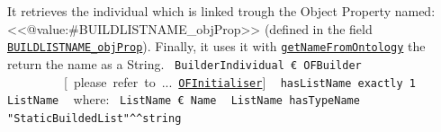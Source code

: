 \begin{description}
\begin{description}
  It retrieves the individual which is linked trough the Object Property named: <<@value:#BUILDLISTNAME_objProp>>
 (defined in the field \texttt{\hyperlink{ontologyFramework.OFRunning.OFInitialising.OFBuilderCommon.BUILDLISTNAME_objProp}{BUILDLISTNAME_objProp}}). Finally, it uses it with
 \texttt{\hyperlink{ontologyFramework.OFDataMapping.ReservatedDataType.NameMapper.getNameFromOntology(org.semanticweb.owlapi.model.OWLNamedIndividual,ontologyFramework.OFContextManagement.OWLReferences)}{getNameFromOntology}}
 the return the name as a String.
 {\ttfamily
\mbox{ }\verb!BuilderIndividual € OFBuilder !\mbox{ }\mbox{ }\mbox{ }\mbox{ }\mbox{ }\mbox{ }\mbox{ }\mbox{ }\mbox{ }[\mbox{ }please\mbox{ }refer\mbox{ }to\mbox{ }...\mbox{ }\texttt{\hyperlink{ontologyFramework.OFRunning.OFInitialising.OFInitialiser-class}{OFInitialiser}}]\mbox{}\newline
\mbox{ }		\verb!hasListName exactly 1 ListName!\mbox{}\newline
\mbox{ }			where:\mbox{ }	\verb!ListName € Name!\mbox{}\newline
\mbox{ }						\verb!ListName hasTypeName "StaticBuildedList"^^string!\mbox{}\newline
\mbox{ }\mbox{ }}


\end{description}
\end{description}
